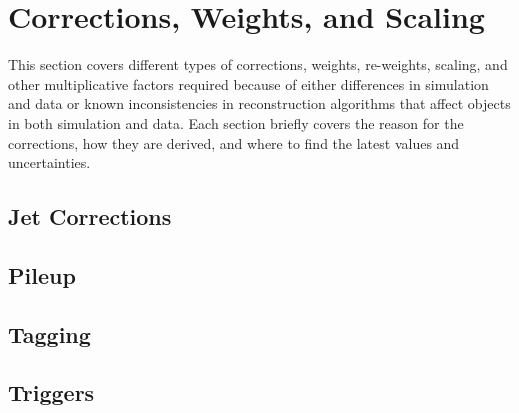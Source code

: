 \section{Corrections, Weights, and Scaling}
This section covers different types of corrections, weights, re-weights, scaling, and other multiplicative factors required because of either differences in simulation and data or known inconsistencies in reconstruction algorithms that affect objects in both simulation and data. Each section briefly covers the reason for the corrections, how they are derived, and where to find the latest values and uncertainties.

\subsection{Jet Corrections}

\subsection{Pileup}

\subsection{Tagging}

\subsection{Triggers}